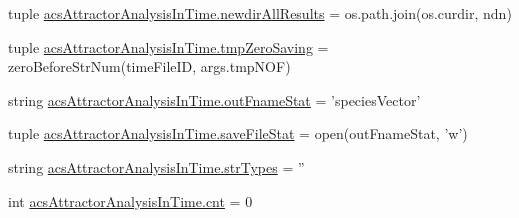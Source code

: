\begin{DoxyCompactItemize}
tuple \hyperlink{a00123_aaf0f6fcbaaf97dcff16b62e86df0209c}{acs\-Attractor\-Analysis\-In\-Time.\-newdir\-All\-Results} = os.\-path.\-join(os.\-curdir, ndn)
\item 
tuple \hyperlink{a00123_ae86fc9dc3283934244ec28446445f722}{acs\-Attractor\-Analysis\-In\-Time.\-tmp\-Zero\-Saving} = zero\-Before\-Str\-Num(time\-File\-I\-D, args.\-tmp\-N\-O\-F)
\item 
string \hyperlink{a00123_a05e902a00f3333a303563029c80605de}{acs\-Attractor\-Analysis\-In\-Time.\-out\-Fname\-Stat} = 'species\-Vector'
\item 
tuple \hyperlink{a00123_a372b8cd0e4d3200958e9c61e3a276fb1}{acs\-Attractor\-Analysis\-In\-Time.\-save\-File\-Stat} = open(out\-Fname\-Stat, 'w')
\item 
string \hyperlink{a00123_a80aeec3ef5cc335351588c6f7c4b76cb}{acs\-Attractor\-Analysis\-In\-Time.\-str\-Types} = ''
\item 
int \hyperlink{a00123_aabada0bdbcd7fb71d37a9310d32f0a28}{acs\-Attractor\-Analysis\-In\-Time.\-cnt} = 0
\end{DoxyCompactItemize}
